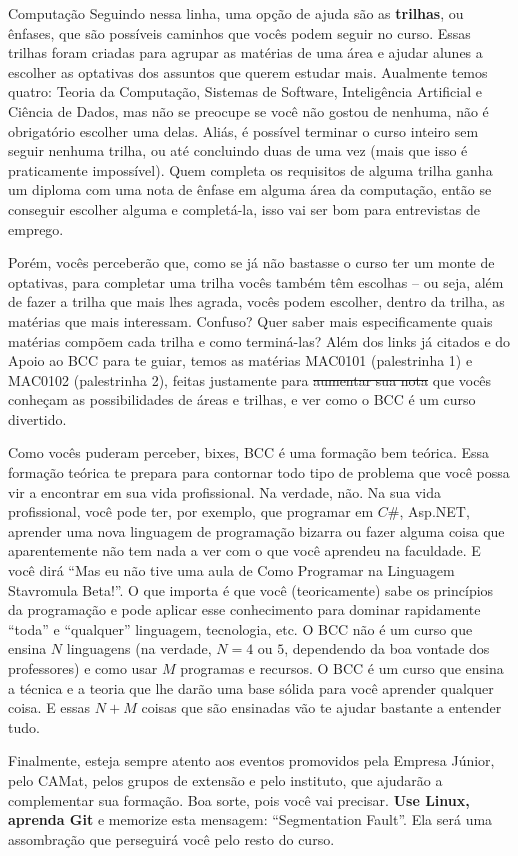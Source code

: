 \begin{subsecao}{Computação}
Seguindo nessa linha, uma opção de ajuda são as \textbf{trilhas}, ou ênfases,
que são possíveis caminhos que vocês podem seguir no curso. Essas trilhas
foram criadas para agrupar as matérias de uma área e ajudar alunes a escolher
as optativas dos assuntos que querem estudar mais. Aualmente temos quatro:
Teoria da Computação, Sistemas de Software, Inteligência Artificial e Ciência
de Dados, mas não se preocupe se você não gostou de nenhuma, não é obrigatório
escolher uma delas. Aliás, é possível terminar o curso inteiro sem seguir
nenhuma trilha, ou até concluindo duas de uma vez (mais que isso é praticamente
impossível). Quem completa os requisitos de alguma trilha ganha um diploma com
uma nota de ênfase em alguma área da computação, então se conseguir escolher
alguma e completá-la, isso vai ser bom para entrevistas de emprego.

Porém, vocês perceberão que, como se já não bastasse o curso ter um monte de
optativas, para completar uma trilha vocês também têm escolhas -- ou seja,
além de fazer a trilha que mais lhes agrada, vocês podem escolher, dentro da
trilha, as matérias que mais interessam. Confuso? Quer saber mais
especificamente quais matérias compõem cada trilha e como terminá-las? Além
dos links já citados e do Apoio ao BCC para te guiar, temos as matérias MAC0101
(palestrinha 1) e MAC0102 (palestrinha 2), feitas justamente para
\sout{aumentar sua nota} que vocês conheçam as possibilidades de áreas e
trilhas, e ver como o BCC é um curso divertido.

Como vocês puderam perceber, bixes, BCC é uma formação bem teórica. Essa
formação teórica te prepara para contornar todo tipo de problema que você
possa vir a encontrar em sua vida profissional. Na verdade, não. Na sua vida
profissional, você pode ter, por exemplo, que programar em $C\#$, Asp.NET,
aprender uma nova linguagem de programação bizarra ou fazer alguma coisa que
aparentemente não tem nada a ver com o que você aprendeu na faculdade. E você
dirá ``Mas eu não tive uma aula de Como Programar na Linguagem Stavromula
Beta!''. O que importa é que você (teoricamente) sabe os princípios da
programação e pode aplicar esse conhecimento para dominar rapidamente ``toda''
e ``qualquer'' linguagem, tecnologia, etc. O BCC não é um curso que ensina $N$
linguagens (na verdade, $N = 4$ ou $5$, dependendo da boa vontade dos
professores) e como usar $M$ programas e recursos. O BCC é um curso que ensina
a técnica e a teoria que lhe darão uma base sólida para você aprender qualquer
coisa. E essas $N + M$ coisas que são ensinadas vão te ajudar bastante a
entender tudo.

Finalmente, esteja sempre atento aos eventos promovidos pela Empresa Júnior,
pelo CAMat, pelos grupos de extensão e pelo instituto, que ajudarão a
complementar sua formação. Boa sorte, pois você vai precisar. \textbf{Use
Linux, aprenda Git} e memorize esta mensagem: ``Segmentation Fault''. Ela será
uma assombração que perseguirá você pelo resto do curso.

\end{subsecao}
